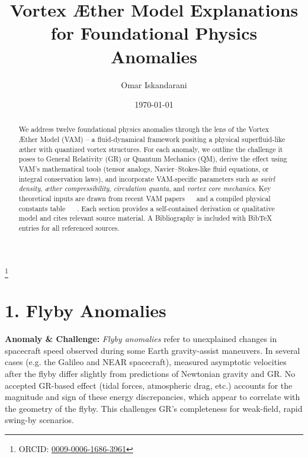 \documentclass[a4paper, aps,preprint,superscriptaddress, 12pt]{revtex4}
\begin{document}
    \author{Omar Iskandarani}
    \title{Vortex Æther Model Explanations for Foundational Physics Anomalies}
    \date{\today}
    \thanks{ORCID: \href{https://orcid.org/0009-0006-1686-3961}{0009-0006-1686-3961}}


    \begin{abstract}
        We address twelve foundational physics anomalies through the lens of the Vortex Æther Model (VAM) – a fluid-dynamical framework positing a physical superfluid-like æther with quantized vortex structures. For each anomaly, we outline the challenge it poses to General Relativity (GR) or Quantum Mechanics (QM), derive the effect using VAM’s mathematical tools (tensor analogs, Navier–Stokes-like fluid equations, or integral conservation laws), and incorporate VAM-specific parameters such as \textit{swirl density}, \textit{æther compressibility}, \textit{circulation quanta}, and \textit{vortex core mechanics}. Key theoretical inputs are drawn from recent VAM papers~\cite{Iskandarani2025a} ~\cite{Iskandarani2025c}  and a compiled physical constants table~\cite{VAM_constants} ~\cite{Iskandarani2025b} . Each section provides a self-contained derivation or qualitative model and cites relevant source material. A Bibliography is included with BibTeX entries for all referenced sources.

    \end{abstract}

  \maketitle


\section*{1. Flyby Anomalies}

\textbf{Anomaly \& Challenge: } \textit{Flyby anomalies} refer to unexplained changes in spacecraft speed observed during some Earth gravity-assist maneuvers. In several cases (e.g. the Galileo and NEAR spacecraft), measured asymptotic velocities after the flyby differ slightly from predictions of Newtonian gravity and GR. No accepted GR-based effect (tidal forces, atmospheric drag, etc.) accounts for the magnitude and sign of these energy discrepancies, which appear to correlate with the geometry of the flyby. This challenges GR’s completeness for weak-field, rapid swing-by scenarios.
\end{document}
